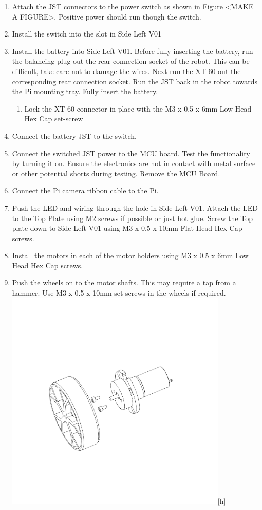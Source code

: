 \documentclass[12pt,titlepage,oneside]{memoir}
\begin{document}
\begin{enumerate}
\item  Attach the JST connectors to the power switch as shown in Figure <MAKE A FIGURE>. Positive power should run though the switch.
\item Install the switch into the slot in Side Left V01
\item Install the battery into Side Left V01. Before fully inserting the battery, run the balancing plug out the rear connection socket of the robot. This can be difficult, take care not to damage the wires. Next run the XT 60 out the corresponding rear connection socket. Run the JST back in the robot towards the Pi mounting tray. Fully insert the battery.
\begin{enumerate}
	\item Lock the XT-60 connector in place with the M3 x 0.5 x 6mm Low Head Hex Cap set-screw
\end{enumerate}
\item Connect the battery JST to the switch.
\item Connect the switched JST power to the MCU board. Test the functionality by turning it on. Ensure the electronics are not in contact with metal surface or other potential shorts during testing. Remove the MCU Board. 
\item Connect the Pi camera ribbon cable to the Pi.
\item Push the LED and wiring through the hole in Side Left V01. Attach the LED to the Top Plate using M2 screws if possible or just hot glue. Screw the Top plate down to Side Left V01 using M3 x 0.5 x 10mm Flat Head Hex Cap screws.\\
\item Install the motors in each of the motor holders using M3 x 0.5 x 6mm Low Head Hex Cap screws.
\item Push the wheels on to the motor shafts. This may require a tap from a hammer. Use M3 x 0.5 x 10mm set screws in the wheels if required.\\
\includegraphics[width=400px]{assem/step3.PDF}[h]

\end{enumerate}
\end{document}
